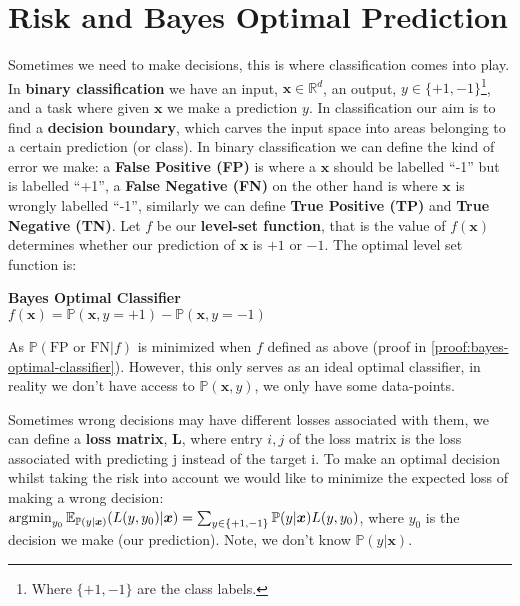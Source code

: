 \section{Risk and Bayes Optimal Prediction}
Sometimes we need to make decisions, this is where classification comes into play. In \textbf{binary classification}  we have an input, $\bm{x} \in \mathbb{R}^{d}$, an output, $y \in \{+1,-1\}$\footnote{Where $ \{+1,-1\}$ are the class labels.}, and a task where given $\bm{x}$ we make a prediction $y$. In classification our aim is to find a \textbf{decision boundary}, which carves the input space into areas belonging to a certain prediction (or class). In binary classification we can define the kind of error we make: a \textbf{False Positive (FP)} is where a $\bm{x}$ should be labelled ``-1'' but is labelled ``+1'', a \textbf{False Negative (FN)} on the other hand is where $\bm{x}$ is wrongly labelled ``-1'', similarly we can define \textbf{True Positive (TP)} and \textbf{True Negative (TN)}. Let $f$ be our \textbf{level-set function}, that is the value of $f(\bm{x})$ determines whether our prediction of $\bm{x}$ is $+1$ or $-1$. The optimal level set function is:
\begin{definition}
    \textbf{Bayes Optimal Classifier} \\
    $f(\bm{x}) = \mathbb{P}(\bm{x}, y=+1) - \mathbb{P}(\bm{x}, y=-1)$
\end{definition} 
As $\mathbb{P}( \text{FP or FN} |f)$ is minimized when $f$ defined as above (proof in \cref{proof:bayes-optimal-classifier}). However, this only serves as an ideal optimal classifier, in reality we don't have access to  $\mathbb{P}(\bm{x},y)$, we only have some data-points. 

Sometimes wrong decisions may have different losses associated with them, we can define a \textbf{loss matrix}, $\bm{L}$, where entry $i,j$ of the loss matrix is the loss associated with predicting j instead of the target i. To make an optimal decision whilst taking the risk into account we would like to minimize the expected loss of making a wrong decision: $\operatorname*{arg\!\min}_{y_{0}} \mathbb{E}_{\mathbb{P}(y| \bm{x})} (L(y,y_{0}) | \bm{x}) = \sum_{y \in \{+1,-1\}} \mathbb{P}(y|\bm{x}) L(y,y_{0})$, where $y_{0}$ is the decision we make (our prediction). Note, we don't know $\mathbb{P}(y|\bm{x})$.


